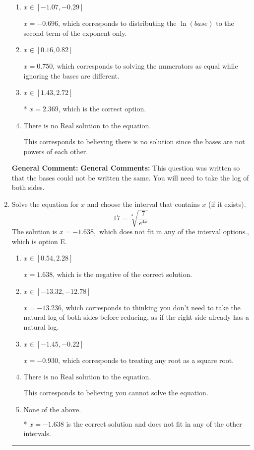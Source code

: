\documentclass{extbook}[14pt]
\newcommand{\litem}[1]{\item #1

\rule{\textwidth}{0.4pt}}
\begin{document}
\begin{enumerate}
{\begin{enumerate}[label=\Alph*.]
$x = -2.552$, which corresponds to distributing the $\ln(base)$ to the first term of the exponent only.
\item \( x \in [-1.07, -0.29] \)

$x = -0.696$, which corresponds to distributing the $\ln(base)$ to the second term of the exponent only.
\item \( x \in [0.16, 0.82] \)

$x = 0.750$, which corresponds to solving the numerators as equal while ignoring the bases are different.
\item \( x \in [1.43, 2.72] \)

* $x = 2.369$, which is the correct option.
\item \( \text{There is no Real solution to the equation.} \)

This corresponds to believing there is no solution since the bases are not powers of each other.
\end{enumerate}

\textbf{General Comment:} \textbf{General Comments:} This question was written so that the bases could not be written the same. You will need to take the log of both sides.
}
\litem{
 Solve the equation for $x$ and choose the interval that contains $x$ (if it exists).
\[  17 = \sqrt[3]{\frac{7}{e^{4x}}} \]The solution is \( x = -1.638, \text{ which does not fit in any of the interval options.} \), which is option E.\begin{enumerate}[label=\Alph*.]
\item \( x \in [0.54, 2.28] \)

$x = 1.638$, which is the negative of the correct solution.
\item \( x \in [-13.32, -12.78] \)

$x = -13.236$, which corresponds to thinking you don't need to take the natural log of both sides before reducing, as if the right side already has a natural log.
\item \( x \in [-1.45, -0.22] \)

$x = -0.930$, which corresponds to treating any root as a square root.
\item \( \text{There is no Real solution to the equation.} \)

This corresponds to believing you cannot solve the equation.
\item \( \text{None of the above.} \)

* $x = -1.638$ is the correct solution and does not fit in any of the other intervals.
\end{enumerate}

}
\end{enumerate}
\end{document}
